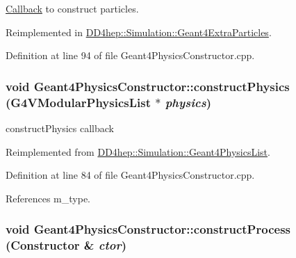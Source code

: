 \hyperlink{class_d_d4hep_1_1_callback}{Callback} to construct particles. 

Reimplemented in \hyperlink{class_d_d4hep_1_1_simulation_1_1_geant4_extra_particles_ad256c3419ba5c43c223157434f74ae49}{DD4hep::Simulation::Geant4ExtraParticles}.

Definition at line 94 of file Geant4PhysicsConstructor.cpp.\hypertarget{class_d_d4hep_1_1_simulation_1_1_geant4_physics_constructor_a97b80e1316943ae5805d8d006fa4f1b5}{
\subsubsection[{constructPhysics}]{\setlength{\rightskip}{0pt plus 5cm}void Geant4PhysicsConstructor::constructPhysics (G4VModularPhysicsList $\ast$ {\em physics})}}
\label{class_d_d4hep_1_1_simulation_1_1_geant4_physics_constructor_a97b80e1316943ae5805d8d006fa4f1b5}


constructPhysics callback 

Reimplemented from \hyperlink{class_d_d4hep_1_1_simulation_1_1_geant4_physics_list_ac930c930b12719772ec5119cdec72ef1}{DD4hep::Simulation::Geant4PhysicsList}.

Definition at line 84 of file Geant4PhysicsConstructor.cpp.

References m\_\-type.\hypertarget{class_d_d4hep_1_1_simulation_1_1_geant4_physics_constructor_a11d516af4f7dcfefe4fa7f154cba4386}{
\subsubsection[{constructProcess}]{\setlength{\rightskip}{0pt plus 5cm}void Geant4PhysicsConstructor::constructProcess ({\bf Constructor} \& {\em ctor})}}
\label{class_d_d4hep_1_1_simulation_1_1_geant4_physics_constructor_a11d516af4f7dcfefe4fa7f154cba4386}



